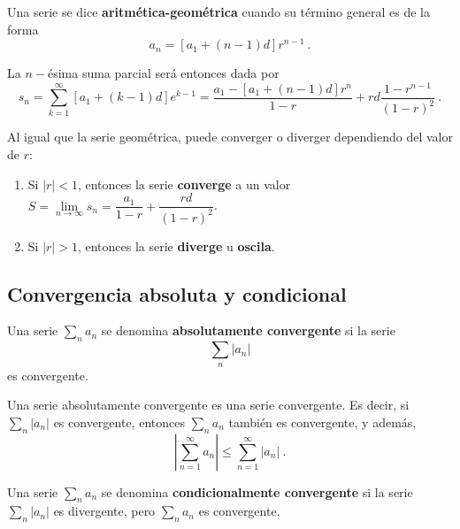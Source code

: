 \begin{defi} 
    Una serie se dice \textbf{aritmética-geométrica} cuando su término general es de la forma 
    \begin{equation}
        a_n = [a_1 + (n-1)d] r^{n-1} \ .
    \end{equation}

    La $n-$ésima suma parcial será entonces dada por 
    \begin{equation}
        s_n = \sum_{k=1}^\infty [a_1 + (k-1)d]e^{k-1} = \frac{a_1 - [a_1 + (n-1)d]r^n}{1-r} + rd \frac{1-r^{n-1}}{(1-r)^2} \ .
    \end{equation}

    Al igual que la serie geométrica, puede converger o diverger dependiendo del valor de $r$:
    \begin{enumerate}
        \item Si $|r| < 1$, entonces la serie \textbf{converge} a un valor $S = \lim\limits_{n\to\infty} s_n = \dfrac{a_1}{1-r} + \dfrac{rd}{(1-r)^2}$.
        \item Si $|r| > 1$, entonces la serie \textbf{diverge} u \textbf{oscila}.
    \end{enumerate}
\end{defi}



\subsection{Convergencia absoluta y condicional}

\begin{defi}
    Una serie $\sum\limits_n a_n$ se denomina \textbf{absolutamente convergente} si la serie
    \begin{equation}
        \sum_n |a_n| 
    \end{equation}
    es convergente.
\end{defi}

\begin{teorema}
    Una serie absolutamente convergente es una serie convergente. Es decir, si $\sum\limits_n |a_n|$ es convergente, entonces $\sum\limits_n a_n$ también es convergente, y además,
    \begin{equation}
        \left| \sum_{n=1}^\infty a_n \right| \leq \sum_{n=1}^\infty |a_n| \ .
    \end{equation}
\end{teorema}

\begin{defi}
    Una serie $\sum\limits_n a_n$ se denomina \textbf{condicionalmente convergente} si la serie $\sum\limits_n |a_n|$ es divergente, pero $\sum\limits_n a_n$ es convergente.
\end{defi}

